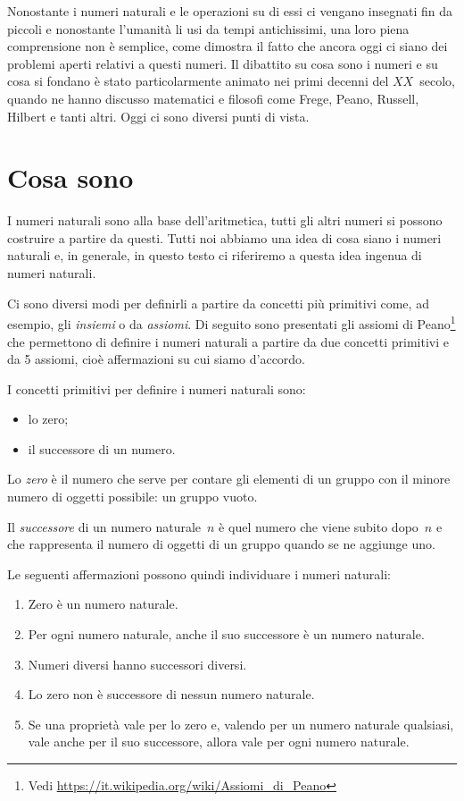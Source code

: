 Nonostante i numeri naturali e le operazioni su di essi ci vengano 
insegnati fin da piccoli e nonostante l'umanità li usi da tempi 
antichissimi, una loro piena comprensione non è semplice, come dimostra 
il fatto che ancora oggi ci siano dei problemi aperti relativi a questi 
numeri. 
Il dibattito su cosa sono i numeri e su cosa si fondano è stato 
particolarmente animato nei primi decenni del \(XX\)~secolo, quando ne 
hanno discusso matematici e filosofi come Frege, Peano, Russell, Hilbert e 
tanti altri. 
Oggi ci sono diversi punti di vista.


\section{Cosa sono}
\label{sec:nat_definizione}

I numeri naturali sono alla base dell'aritmetica, 
tutti gli altri numeri si possono costruire a partire da questi. 
Tutti noi abbiamo una idea di cosa siano i numeri naturali e, in generale, 
in questo testo ci riferiremo a questa idea ingenua di numeri naturali.

Ci sono diversi modi per definirli a partire da concetti più primitivi 
come, ad esempio, gli \emph{insiemi} o da \emph{assiomi}.
Di seguito sono presentati gli assiomi di Peano\footnote{
Vedi \url{https://it.wikipedia.org/wiki/Assiomi_di_Peano}}
che permettono di definire i numeri naturali a partire da due concetti 
primitivi e da 5 assiomi, cioè affermazioni su cui 
siamo d'accordo.

I concetti primitivi per definire i numeri naturali sono:

\begin{itemize}[noitemsep]
\item lo zero;
\item il successore di un numero.
\end{itemize}

Lo \emph{zero} è il numero che serve per contare gli elementi 
di un gruppo con il minore numero di oggetti possibile: un gruppo vuoto.

Il \emph{successore} di un numero naturale~\(n\) è quel 
numero che viene subito dopo~\(n\) e che rappresenta il numero di 
oggetti di un gruppo quando se ne aggiunge uno.

Le seguenti affermazioni possono quindi individuare i numeri naturali:

\begin{enumerate}[noitemsep]
\item Zero è un numero naturale.
\item Per ogni numero naturale, anche il suo successore è un numero 
naturale.
\item Numeri diversi hanno successori diversi.
\item Lo zero non è successore di nessun numero naturale.
\item Se una proprietà vale per lo zero e, 
valendo per un numero naturale qualsiasi, 
vale anche per il suo successore, 
allora vale per ogni numero naturale.
\end{enumerate}

